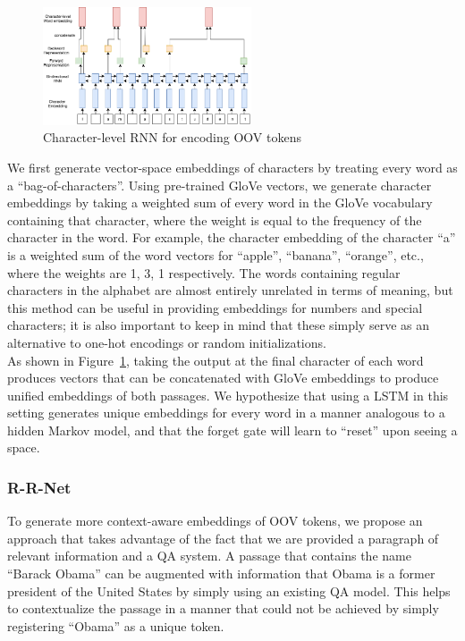\documentclass{article}
\begin{document}
\begin{figure}[h]
	\includegraphics[width=0.55\textwidth]{char_word2vec.png}
	\centering
	\caption{Character-level RNN for encoding OOV tokens}
	\label{fig:charRNN}
\end{figure}

We first generate vector-space embeddings of characters by treating every word as a ``bag-of-characters''. Using pre-trained GloVe vectors, we generate character embeddings by taking a weighted sum of every word in the GloVe vocabulary containing that character, where the weight is equal to the frequency of the character in the word. For example, the character embedding of the character ``a'' is a weighted sum of the word vectors for ``apple'', ``banana'', ``orange'', etc., where the weights are 1, 3, 1 respectively. The words containing regular characters in the alphabet are almost entirely unrelated in terms of meaning, but this method can be useful in providing embeddings for numbers and special characters; it is also important to keep in mind that these simply serve as an alternative to one-hot encodings or random initializations. \\

As shown in Figure~\ref{fig:charRNN}, taking the output at the final character of each word produces vectors that can be concatenated with GloVe embeddings to produce unified embeddings of both passages. We hypothesize that using a LSTM in this setting generates unique embeddings for every word in a manner analogous to a hidden Markov model, and that the forget gate will learn to ``reset'' upon seeing a space.

\subsubsection{R-R-Net}
To generate more context-aware embeddings of OOV tokens, we propose an approach that takes advantage of the fact that we are provided a paragraph of relevant information and a QA system. A passage that contains the name ``Barack Obama'' can be augmented with information that Obama is a former president of the United States by simply using an existing QA model. This helps to contextualize the passage in a manner that could not be achieved by simply registering ``Obama'' as a unique token.
\end{document}
